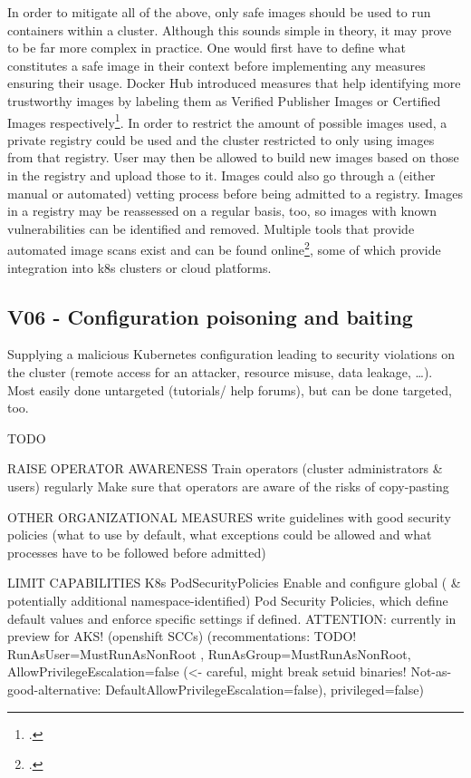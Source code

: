In order to mitigate all of the above, only safe images should be used to run containers within a cluster. Although this sounds simple in theory, it may prove to be far more complex in practice.  One would first have to define what constitutes a safe image in their context before implementing any measures ensuring their usage.
Docker Hub introduced measures that help identifying more trustworthy images by labeling them as Verified Publisher Images or Certified Images respectively\footcite[][, sections 'Verified Publisher Images and Plugins' and 'Certified Images and Plugins']{safeImagesDockerhub}.
In order to restrict the amount of possible images used, a private registry could be used and the cluster restricted to only using images from that registry. User may then be allowed to build new images based on those in the registry and upload those to it. 
Images could also go through a (either manual or automated) vetting process before being admitted to a registry. Images in a registry may be reassessed on a regular basis, too, so images with known vulnerabilities can be identified and removed. Multiple tools that provide automated image scans exist and can be found online\footcite[][, section 'Securing your container images']{k8sBookWebsite}, some of which provide integration into \gls{k8s} clusters or cloud platforms.

\subsection{V06 - Configuration poisoning and baiting}
Supplying a malicious Kubernetes configuration leading to security violations on the cluster (remote access for an attacker, resource misuse, data leakage, …). Most easily done untargeted (tutorials/ help forums), but can be done targeted, too.

TODO

RAISE OPERATOR AWARENESS
	Train operators (cluster administrators \& users) regularly									
	Make sure that operators are aware of the risks of copy-pasting									
										
OTHER ORGANIZATIONAL MEASURES
	write guidelines with good security policies (what to use by default, what exceptions could be allowed and what processes have to be followed before admitted)	

LIMIT CAPABILITIES
	K8s PodSecurityPolicies			Enable and configure global ( \& potentially additional namespace-identified) Pod Security Policies, which define default values and enforce specific settings if defined. ATTENTION: currently in preview for AKS!						
	(openshift SCCs)			(recommentations: TODO! RunAsUser=MustRunAsNonRoot , RunAsGroup=MustRunAsNonRoot, AllowPrivilegeEscalation=false (<- careful, might break setuid binaries! Not-as-good-alternative: DefaultAllowPrivilegeEscalation=false), privileged=false)						
										
